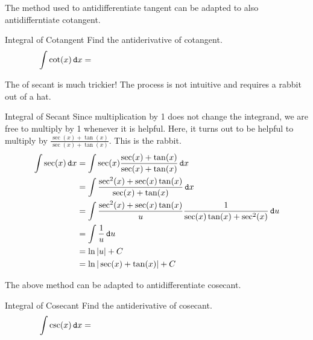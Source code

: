 The method used to antidifferentiate tangent can be adapted to also antidifferntiate cotangent.
\begin{exercise}{Integral of Cotangent \Coffeecup \Coffeecup}
Find the antiderivative of cotangent.  
$$\int \cot(x) \dif x = \hspace*{3in}$$
\end{exercise}

The  of secant is much trickier!  The process is not intuitive and requires a rabbit out of a hat.
\begin{example}{Integral of Secant} 
Since multiplication by 1 does not change the integrand, we are free to multiply by 1 whenever it is helpful.  Here, it turns out to be helpful to multiply by $\frac{\sec(x)+\tan(x)}{\sec(x)+\tan(x)}$.  This is the rabbit.
\begin{align*}
\int \sec(x)\mathop{}\!\mathtt{d} x &=\int \sec(x)\frac{\sec(x)+\tan(x)}{\sec(x)+\tan(x)} \mathop{}\!\mathtt{d} x \\
&=\int \frac{\sec^2(x)+\sec(x)\tan(x)}{\sec(x)+\tan(x)} \mathop{}\!\mathtt{d} x \\
&=\int \frac{\sec^2(x)+\sec(x)\tan(x)}{u} \frac{1}{\sec(x)\tan(x)+\sec^2(x)}\mathop{}\!\mathtt{d} u \\
&=\int \frac{1}{u}\mathop{}\!\mathtt{d} u \\
&=\ln|u|+C \\
&=\ln|\sec(x)+\tan(x)|+C
\end{align*}
\end{example}

The above method can be adapted to antidifferentiate cosecant.
\begin{exercise}{Integral of Cosecant \Coffeecup \Coffeecup}
Find the antiderivative of cosecant.  
$$\int \csc(x) \dif x = \hspace*{3in}$$
\vspace*{2in}
\end{exercise}
